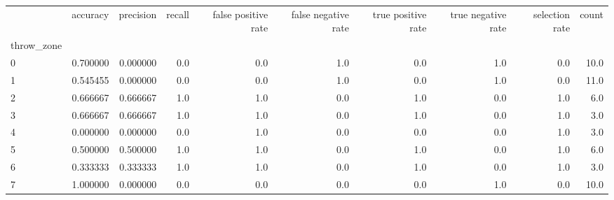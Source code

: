\begin{tabular}{lrrrrrrrrr}
\toprule
{} &  accuracy &  precision &  recall &  false positive rate &  false negative rate &  true positive rate &  true negative rate &  selection rate &  count \\
throw\_zone &           &            &         &                      &                      &                     &                     &                 &        \\
\midrule
0          &  0.700000 &   0.000000 &     0.0 &                  0.0 &                  1.0 &                 0.0 &                 1.0 &             0.0 &   10.0 \\
1          &  0.545455 &   0.000000 &     0.0 &                  0.0 &                  1.0 &                 0.0 &                 1.0 &             0.0 &   11.0 \\
2          &  0.666667 &   0.666667 &     1.0 &                  1.0 &                  0.0 &                 1.0 &                 0.0 &             1.0 &    6.0 \\
3          &  0.666667 &   0.666667 &     1.0 &                  1.0 &                  0.0 &                 1.0 &                 0.0 &             1.0 &    3.0 \\
4          &  0.000000 &   0.000000 &     0.0 &                  1.0 &                  0.0 &                 0.0 &                 0.0 &             1.0 &    3.0 \\
5          &  0.500000 &   0.500000 &     1.0 &                  1.0 &                  0.0 &                 1.0 &                 0.0 &             1.0 &    6.0 \\
6          &  0.333333 &   0.333333 &     1.0 &                  1.0 &                  0.0 &                 1.0 &                 0.0 &             1.0 &    3.0 \\
7          &  1.000000 &   0.000000 &     0.0 &                  0.0 &                  0.0 &                 0.0 &                 1.0 &             0.0 &   10.0 \\
\bottomrule
\end{tabular}
